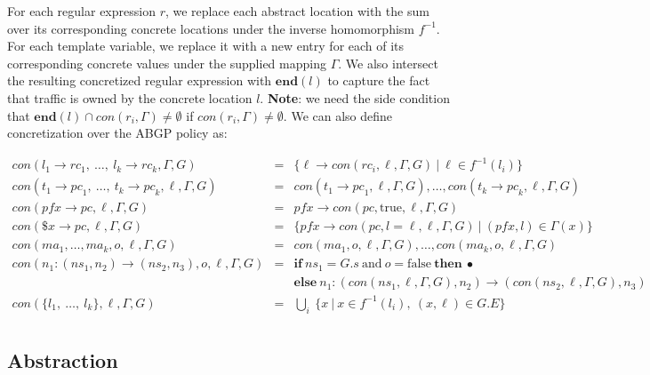\documentclass[twocolumn]{sig-alternate-10pt}
\begin{document}
For each regular expression $r$, we replace each abstract location with the sum over its corresponding concrete locations under the inverse homomorphism $f^{-1}$. For each template variable, we replace it with a new entry for each of its corresponding concrete values under the supplied mapping $\Gamma$. We also intersect the resulting concretized regular expression with $\textbf{end}(l)$ to capture the fact that traffic is owned by the concrete location $l$. \textbf{Note}: we need the side condition that $\textbf{end}(l) \cap con(r_i,\Gamma) \neq \emptyset$ if $con(r_i,\Gamma) \neq \emptyset$.
We can also define concretization over the ABGP policy as:

\[ \begin{array}{lcl}
     con(l_1 \rightarrow {rc}_1, ~\dots,~ l_k \rightarrow {rc}_k,\Gamma,G) 
        & = & 
        \{ \ell \rightarrow con(rc_i,\ell,\Gamma,G)  ~\vert~ \ell \in f^{-1}(l_i) \}
        \\
     con(t_1 \rightarrow {pc}_1, ~\dots,~ t_k \rightarrow {pc}_k,\ell,\Gamma,G) 
        & = &  
        con(t_1 \rightarrow {pc}_1,\ell,\Gamma,G), \dots, con(t_k \rightarrow {pc}_k,\ell,\Gamma,G)
        \\
     con(pfx \rightarrow {pc},\ell,\Gamma,G) 
        & = &  
        pfx \rightarrow con(pc,\text{true},\ell,\Gamma,G)
        \\
     con(\$x \rightarrow {pc},\ell,\Gamma,G) 
        & = &  
        \{ pfx \rightarrow con(pc, l=\ell, \ell,\Gamma,G) ~\vert~ (pfx, l) \in \Gamma(x) \}
        \\
     con(ma_1, \dots, ma_k,o,\ell,\Gamma,G) 
        & = &
        con(ma_1,o,\ell,\Gamma,G), \dots, con(ma_k,o,\ell,\Gamma,G)
        \\

     con(n_1 : ({ns}_1, n_2) \rightarrow ({ns}_2, n_3),o,\ell,\Gamma,G) 
        & = & \textbf{if}~ ns_1 = G.s ~\text{and}~ o = \text{false} ~\textbf{then}~ \bullet \\
        &   & \textbf{else}~ n_1 : ( con({ns}_1,\ell,\Gamma,G), n_2) \rightarrow (con({ns}_2,\ell,\Gamma,G),n_3)

        \\
     con(\{ l_1, ~\dots,~ l_k \}, \ell, \Gamma,G) 
        & = &  
        \bigcup_i ~ \{ x ~\vert~ x \in f^{-1}(l_i),~ (x,\ell) \in G.E \}
        \\
\end{array} \]

\subsection{Abstraction}
\end{document}
